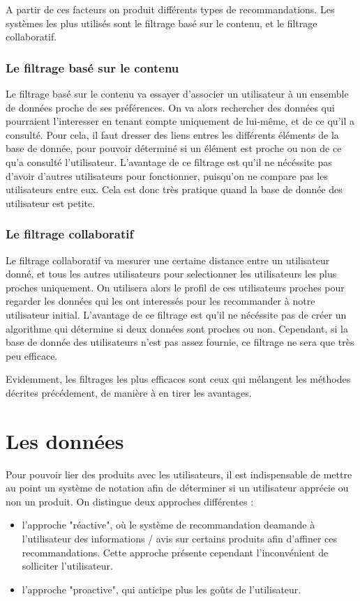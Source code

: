 \documentclass{report}
\begin{document}
A partir de ces facteurs on produit différents types de recommandations.
Les systèmes les plus utilisés sont le filtrage basé sur le contenu, et le filtrage collaboratif.

\subsubsection{Le filtrage basé sur le contenu}
Le filtrage basé sur le contenu va essayer d'associer un utilisateur à un ensemble de données proche de ses préférences. On va alors rechercher des données qui pourraient l'interesser en tenant compte uniquement de lui-même, et de ce qu'il a consulté. Pour cela, il faut dresser des liens entres les différents éléments de la base de donnée, pour pouvoir déterminé si un élément est proche ou non de ce qu'a consulté l'utilisateur.
L'avantage de ce filtrage est qu'il ne nécéssite pas d'avoir d'autres utilisateurs pour fonctionner, puisqu'on ne compare pas les utilisateurs entre eux. Cela est donc très pratique quand la base de donnée des utilisateur est petite.
\subsubsection{Le filtrage collaboratif}
Le filtrage collaboratif va mesurer une certaine distance entre un utilisateur donné, et tous les autres utilisateurs pour selectionner les utilisateurs les plus proches uniquement.
On utilisera alors le profil de ces utilisateurs proches pour regarder les données qui les ont interessés pour les recommander à notre utilisateur initial.
L'avantage de ce filtrage est qu'il ne nécéssite pas de créer un algorithme qui détermine si deux données sont proches ou non. Cependant, si la base de donnée des utilisateurs n'est pas assez fournie, ce filtrage ne sera que très peu efficace.\par
Evidemment, les filtrages les plus efficaces sont ceux qui mélangent les méthodes décrites précédement, de manière à en tirer les avantages.

\section{Les données}
Pour pouvoir lier des produits avec les utilisateurs, il est indispensable de mettre au point un système de notation afin de déterminer si un utilisateur apprécie ou non un produit.
On distingue deux approches différentes :
\begin{itemize}
  \item l'approche "réactive", où le système de recommandation deamande à l'utilisateur des informations / avis sur certains produits afin d'affiner ces recommandations. Cette approche présente cependant l'inconvénient de solliciter l'utilisateur.
  \item l'approche "proactive", qui anticipe plus les goûts de l'utilisateur.
\end{itemize}
\end{document}
